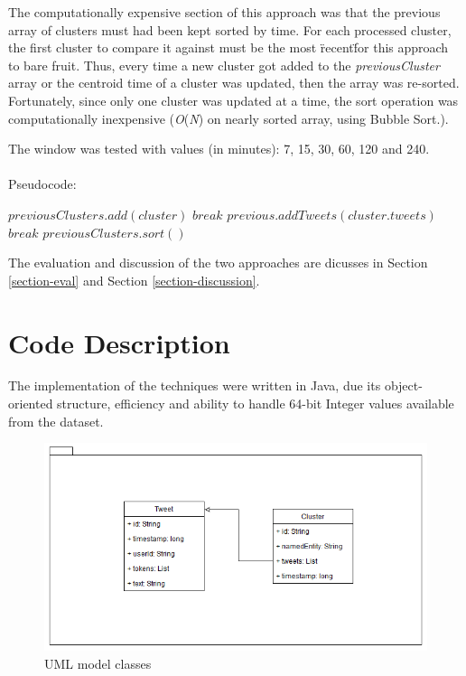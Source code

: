 \documentclass[a4paper,portrait,12pt]{article}
\begin{document}
\begin{enumerate}
	      The computationally expensive section of this approach was that the previous array of clusters must had been kept sorted by time.
	      For each processed cluster, the first cluster to compare it against must be the most \"recent\" for this approach to bare fruit.
	      Thus, every time a new cluster got added to the \textit{previousCluster} array or the centroid time of a cluster was updated, then the array was re-sorted.\\
	      Fortunately, since only one cluster was updated at a time, the sort operation was computationally inexpensive (\textit{O}(\textit{N}) on nearly sorted array, using Bubble Sort.).

	      The window was tested with values (in minutes): 7, 15, 30, 60, 120 and 240.
	      \\\\
	      Pseudocode:
	      \begin{algorithmic}
		      \State $previousClusters.add(cluster)$
		      \State $break$
		      \EndIf
		      \State $previous.addTweets(cluster.tweets)$
		      \State $break$
		      \EndIf
		      \EndFor
		      \State $previousClusters.sort()$
		      \EndFor
	      \end{algorithmic}
\end{enumerate}

The evaluation and discussion of the two approaches are dicusses in Section \ref{section-eval} and Section \ref{section-discussion}.

\section{Code Description}
The implementation of the techniques were written in Java, due its object-oriented structure, efficiency and ability to handle 64-bit Integer values available from the dataset.

\begin{figure}[h!]
	\centering
	\includegraphics[width=0.5\linewidth]{images/modelUML.png}
	\caption{UML model classes}
	\label{fig:modelUML}
\end{figure}
\end{document}

